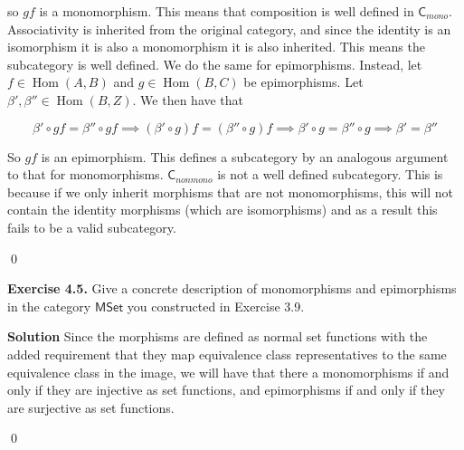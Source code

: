 \documentclass[titlepage]{article}
\newcommand{\Exercise}[1]{\textbf{Exercise #1}}
\newcommand{\Solution}{\textbf{Solution }}
\newcommand{\cat}[1]{\mathsf{#1}}
\newcommand{\Cat}{\cat{C}}
\DeclareMathOperator{\Hom}{Hom}
\begin{document}
so $gf$ is a monomorphism. This means that composition is well defined in $\Cat_{mono}$. Associativity is inherited from the original category, and since the identity is an isomorphism it is also a monomorphism it is also inherited. This means the subcategory is well defined. We do the same for epimorphisms. Instead, let $f \in \Hom(A,B)$ and $g \in \Hom(B,C)$ be epimorphisms. Let $\beta',\beta'' \in \Hom(B,Z)$. We then have that

\[\beta' \circ gf = \beta'' \circ gf \implies (\beta' \circ g)f = (\beta'' \circ g)f \implies \beta' \circ g = \beta'' \circ g \implies \beta' = \beta'' \]

So $gf$ is an epimorphism. This defines a subcategory by an analogous argument to that for monomorphisms. $\Cat_{nonmono}$ is not a well defined subcategory. This is because if we only inherit morphisms that are not monomorphisms, this will not contain the identity morphisms (which are isomorphisms) and as a result this fails to be a valid subcategory.

\qed

\bigskip


\Exercise{4.5.} Give a concrete description of monomorphisms and epimorphisms in the category $\cat{MSet}$ you constructed in Exercise 3.9.

\medskip

\Solution Since the morphisms are defined as normal set functions with the added requirement that they map equivalence class representatives to the same equivalence class in the image, we will have that there a monomorphisms if and only if they are injective as set functions, and epimorphisms if and only if they are surjective as set functions.

\qed
\end{document}
